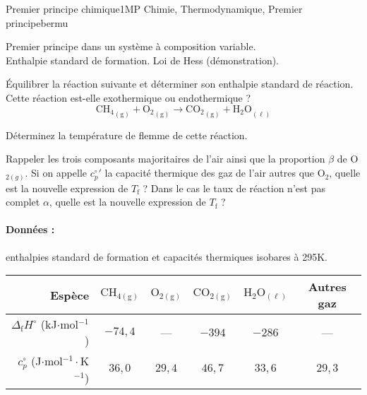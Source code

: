 
\begin{exercise}{Premier principe chimique}{1}{MP}
{Chimie, Thermodynamique, Premier principe}{bermu}


\begin{questions}
    \questioncours Premier principe dans un système à composition variable. \\ Enthalpie standard de formation. Loi de Hess (démonstration).
    
    
    \question \'Equilibrer la réaction suivante et déterminer son enthalpie standard de réaction. Cette réaction est-elle exothermique ou endothermique ?
    $$\mathrm{{CH_4}_{(g)} + {O_2}_{(g)} \longrightarrow {CO_2}_{(g)} + {H_2O}_{(\ell)}}$$
    
    \question Déterminez la température de flemme de cette réaction.
    
    \question Rappeler les trois composants majoritaires de l'air ainsi que la proportion $\beta$ de O$_{2(g)}$.
    \question Si on appelle ${c^\circ_p}'$ la capacité thermique des gaz de l'air autres que O$_2$, quelle est la nouvelle expression de $T_\text{f}$ ?
    \question Dans le cas le taux de réaction n'est pas complet $\alpha$, quelle est la nouvelle expression de $T_\text{f}$ ? 
    
\end{questions}

\paragraph{Données :} enthalpies standard de formation et capacités thermiques isobares à 295K.

\begin{table}[H]
    \qquad\begin{tabular}{r|ccccc}
        Espèce & $\mathrm{CH_{4 (g)}}$ & $\mathrm{O_{2 (g)}}$ & $\mathrm{CO_{2 (g)}}$ & $\mathrm{H_2O_{(\ell)}}$ & Autres gaz \\ \hline\hline
        $\Delta_\text{f}H^\circ$ (kJ$\cdot$mol$^{-1}$) & $-74,4$ & --- & $-394$ & $-286$ & --- \\
        $c_p^\circ$ (J$\cdot$mol$^{-1}\cdot$K$^{-1}$) & $36,0$ & $29,4$ & $46,7$ & $33,6$ & $29,3$ \\ \hline
    \end{tabular}
\end{table}
\end{exercise}
